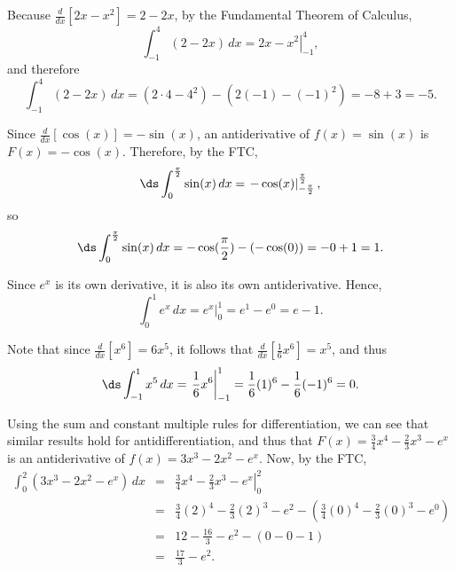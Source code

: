 \begin{activitySolution}
\ba
	\item Because $\frac{d}{dx}[2x - x^2] = 2-2x$, by the Fundamental Theorem of Calculus,
	$$ \int_{-1}^4 (2-2x) \, dx = \left. 2x - x^2 \right|_{-1}^4,$$
	and therefore 
	$$ \int_{-1}^4 (2-2x) \, dx = (2 \cdot 4 - 4^2) - (2(-1) - (-1)^2) = -8 + 3 = -5.$$
	\item Since $\frac{d}{dx} [\cos(x)] = -\sin(x)$, an antiderivative of $f(x) = \sin(x)$ is $F(x) = -\cos(x)$.  Therefore, by the FTC,  
	$$\ds \int_{0}^{\frac{\pi}{2}} \sin(x) \, dx = \left. -\cos(x) \right|_{-\frac{\pi}{2}}^{\frac{\pi}{2}},$$
	so
	$$\ds \int_{0}^{\frac{\pi}{2}} \sin(x) \, dx = -\cos(\frac{\pi}{2}) - (-\cos(0)) = -0 + 1 = 1.$$
	\item Since $e^x$ is its own derivative, it is also its own antiderivative.  Hence,
	$$\int_0^1 e^x \, dx = \left. e^x \right|_0^1 = e^1 - e^0 = e-1.$$
	\item Note that since $\frac{d}{dx} [x^6] = 6x^5$, it follows that $\frac{d}{dx} [\frac{1}{6}x^6] = x^5$, and thus 
	$$\ds \int_{-1}^{1} x^5 \, dx = \left. \frac{1}{6}x^6 \right|_{-1}^1 = \frac{1}{6} (1)^6 - \frac{1}{6}(-1)^6 = 0.$$
	\item Using the sum and constant multiple rules for differentiation, we can see that similar results hold for antidifferentiation, and thus that $F(x) = \frac{3}{4} x^4 - \frac{2}{3} x^3 - e^x$ is an antiderivative of $f(x) = 3x^3 - 2x^2 - e^x$.  Now, by the FTC,
	\begin{eqnarray*}
	\int_0^2 (3x^3 - 2x^2 - e^x) \, dx & = & \left. \frac{3}{4} x^4 - \frac{2}{3} x^3 - e^x \right|_0^2 \\
				& = &   \frac{3}{4} (2)^4 - \frac{2}{3} (2)^3 - e^2 - (\frac{3}{4} (0)^4 - \frac{2}{3} (0)^3 - e^0) \\
				& = & 12 - \frac{16}{3} - e^2 - (0 - 0 - 1) \\
				& = & \frac{17}{3} - e^2.
	\end{eqnarray*}  
\ea
\end{activitySolution}
\aftera